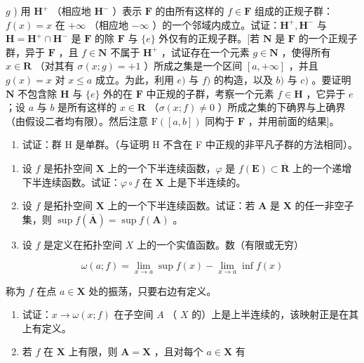 \(g\) ) 用 \(\mathbf{H}^{+}\) （相应地 \(\mathbf{H}^{-}\) ）表示 \(\mathbf{F}\) 的由所有这样的 \(f\in \mathbf{F}\) 组成的正规子群：\(f(x) = x\) 在 \(+\infty\) （相应地 \(-\infty\) ）的一个邻域内成立。试证：\(\mathbf{H}^{+},\mathbf{H}^{-}\) 与 \(\mathbf{H} = \mathbf{H}^{+}\cap \mathbf{H}^{-}\) 是 \(\mathbf{F}\) 的除 \(\mathbf{F}\) 与 \(\{e\}\) 外仅有的正规子群。{[}若 \(\mathbf{N}\) 是 \(\mathbf{F}\) 的一个正规子群，异于 \(\mathbf{F}\) ，且 \(f\in \mathbf{N}\) 不属于 \(\mathbf{H}^{+}\) ，试证存在一个元素 \(g\in \mathbf{N}\) ，使得所有 \(x\in \mathbf{R}\) （对其有 \(\sigma (x;g) = +1\) ）所成之集是一个区间 \([a, + \infty ]\) ，并且 \(g(x) = x\) 对 \(x\leqslant a\) 成立。为此，利用 \(e)\) 与 \(f)\) 的构造，以及 \(b)\) 与 \(c)\) 。要证明 \(\mathbf{N}\) 不包含除 \(\mathbf{H}\) 与 \(\{e\}\) 外的在 \(\mathbf{F}\) 中正规的子群，考察一个元素 \(f\in \mathbf{H}\) ，它异于 \(e\) ；设 \(a\) 与 \(b\) 是所有这样的 \(x\in \mathbf{R}\) （\(\sigma (x;f)\neq 0\) ）所成之集的下确界与上确界（由假设二者均有限）。然后注意 \(\mathrm{F}([a,b])\) 同构于 \(\mathbf{F}\) ，并用前面的结果{]}。

\begin{enumerate}
\def\labelenumi{\alph{enumi})}
\setcounter{enumi}{7}
\tightlist
\item
试证：群 H 是单群。（与证明 H 不含在 F 中正规的非平凡子群的方法相同）。
\end{enumerate}

\begin{enumerate}
\def\labelenumi{\arabic{enumi})}
\setcounter{enumi}{3}
\item
设 \(f\) 是拓扑空间 \(\mathbf{X}\) 上的一个下半连续函数，\(\varphi\) 是 \(f(\mathbf{E}) \subset \overline{\mathbf{R}}\) 上的一个递增下半连续函数。试证：\(\varphi \circ f\) 在 \(\mathbf{X}\) 上是下半连续的。
\item
设 \(f\) 是拓扑空间 \(\mathbf{X}\) 上的一个下半连续函数。试证：若 \(\mathbf{A}\) 是 \(\mathbf{X}\) 的任一非空子集，则 \(\sup f(\overline{\mathbf{A}}) = \sup f(\mathbf{A})\) 。
\item
设 \(f\) 是定义在拓扑空间 \(X\) 上的一个实值函数。数（有限或无穷）
\end{enumerate}

\[
\omega (a; f) = \lim _ {x \to a} \sup f (x) - \lim _ {x \to a} \inf f (x)
\]

称为 \(f\) 在点 \(a \in \mathbf{X}\) 处的振荡，只要右边有定义。

\begin{enumerate}
\def\labelenumi{\alph{enumi})}
\item
试证：\(x \to \omega(x; f)\) 在子空间 \(A\) （ \(X\) 的）上是上半连续的，该映射正是在其上有定义。
\item
若 \(f\) 在 \(\mathbf{X}\) 上有限，则 \(\mathbf{A} = \mathbf{X}\) ，且对每个 \(a \in \mathbf{X}\) 有
\end{enumerate}

